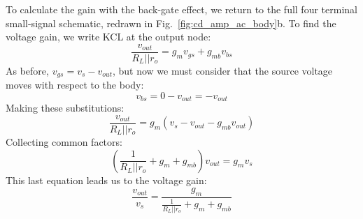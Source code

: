 To calculate the gain with the back-gate effect, we return to the full four terminal small-signal schematic, redrawn in Fig.~\ref{fig:cd_amp_ac_body}b.  To find the voltage gain, we write KCL at the output node: 
\begin{equation}
	\frac{{{v_{out}}}}{{{R_L}||{r_o}}} = {g_m}{v_{gs}} + g_{mb} v_{bs} 
\end{equation}
As before, $v_{gs} = v_{s} - v_{out}$, but now we must consider that the source voltage moves with respect to the body:
\begin{equation}
	v_{bs} = 0 - v_{out} = -v_{out}
\end{equation}
Making these substitutions:
\begin{equation}
	\frac{{{v_{out}}}}{{{R_L}||{r_o}}} = {g_m}\left( {{v_{s}} - {v_{out}}}  - g_{mb} v_{out} \right)
\end{equation}
Collecting common factors:
\begin{equation}
	\left( {\frac{1}{{{R_L}||{r_o}}} + {g_m} + g_{mb} } \right){v_{out}} = {g_m}{v_{s}}
\end{equation}
This last equation leads us to the voltage gain:
\begin{equation}
	\frac{{{v_{out}}}}{{{v_{s}}}} = \frac{{{g_m}}}{{\frac{1}{{{R_L}||{r_o}}} + {g_m} + g_{mb}}}
\end{equation}
